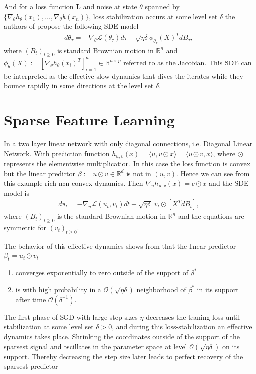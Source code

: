 And for a loss function $\mathbf{L}$ and noise at state $\theta$ spanned by
$\{\nabla_\theta h_\theta(x_1) ,\ldots , \nabla_\theta h(x_n)\}$, loss
stabilization occurs at some level set $\delta$ the authors of
\cite{andriushchenko2023sgd} propose the following SDE model
\begin{align*}
    d\theta_\tau = -\nabla_\theta \mathcal{L}(\theta_\tau)d\tau
    + \sqrt{\eta\delta}
    \phi_{\theta_\tau}\left(X\right)^{T}dB_\tau,
\end{align*}
where $(B_t)_{t\ge 0}$ is standard Brownian motion in $\mathbb{R}^{n}$ and
$\phi_{\theta}(X) := [\nabla_{\theta}h_{\theta}(x_i)^{T}]_{i=1}^{n} \in
\mathbb{R}^{n\times p}$ referred to as the Jacobian. This SDE can be
interpreted as the effective slow dynamics that dives the iterates while they
bounce rapidly in some directions at the level set $\delta$.


\section{Sparse Feature Learning}
In a two layer linear network with only diagonal connections, i.e. Diagonal
Linear Network. With prediction function $h_{u, v}(x) = \langle u, v\odot
x\rangle = \langle u \odot v, x\rangle$, where $\odot$ represents the
elementwise multiplication. In this case the loss function is convex but the
linear predictor $\beta:=u\odot v \in \mathbb{R}^{d}$ is not in $(u, v)$.
Hence we can see from this example rich non-convex dynamics. Then $\nabla_u
h_{u, v}(x) = v \odot x$  and the SDE model is
\begin{align}
    du_t = -\nabla_u \mathcal{L}(u_t, v_t) dt + \sqrt{\eta\delta}\; v_t \odot
    [X^{T}dB_t],
\end{align}
where $(B_t)_{t\ge 0}$ is the standard Brownian motion in $\mathbb{R}^{n}$
and the equations are symmetric for $(v_t)_{t\ge 0}$.

The behavior of this effective dynamics shows from
\cite{pillaudvivien2022label}
that the linear predictor $\beta_t = u_t \odot v_t$
\begin{enumerate}
    \item converges exponentially to zero outside of the support of $\beta^{*}$
    \item is with high probability in a $\mathcal{O}(\sqrt{\eta\delta})$
        neighborhood of $\beta^{*}$ in its support after time
        $\mathcal{O}( \delta^{-1})$.
\end{enumerate}

The first phase of SGD with large step sizes $\eta$ decreases the traning
loss until stabilization at some level set $\delta > 0$, and during this
loss-stabilization an effective dynamics takes place. Shrinking the
coordinates outside of the support of the sparsest signal and oscillates in
the parameter space at level $\mathcal{O}(\sqrt{\eta\delta})$ on its support.
Thereby decreasing the step size later leads to perfect recovery of the
sparsest predictor


